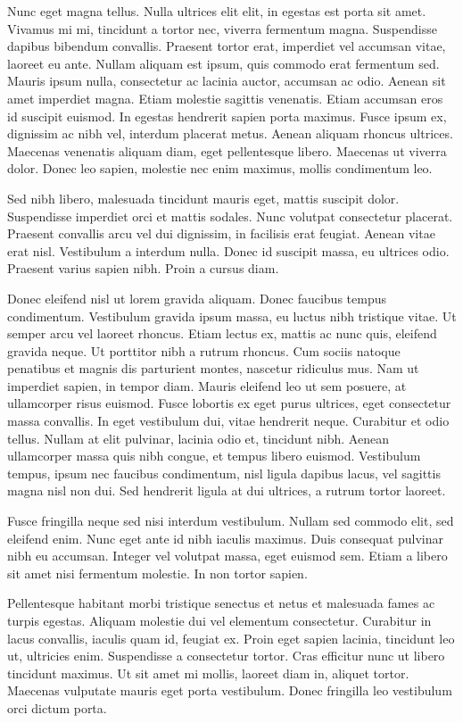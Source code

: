 \documentclass[12pt, letterpaper,twocolumn]{article}
\begin{document}
Nunc eget magna tellus. Nulla ultrices elit elit, in egestas est porta sit amet. Vivamus mi mi, tincidunt a tortor nec, viverra fermentum magna. Suspendisse dapibus bibendum convallis. Praesent tortor erat, imperdiet vel accumsan vitae, laoreet eu ante. Nullam aliquam est ipsum, quis commodo erat fermentum sed. Mauris ipsum nulla, consectetur ac lacinia auctor, accumsan ac odio. Aenean sit amet imperdiet magna. Etiam molestie sagittis venenatis. Etiam accumsan eros id suscipit euismod. In egestas hendrerit sapien porta maximus. Fusce ipsum ex, dignissim ac nibh vel, interdum placerat metus. Aenean aliquam rhoncus ultrices. Maecenas venenatis aliquam diam, eget pellentesque libero. Maecenas ut viverra dolor. Donec leo sapien, molestie nec enim maximus, mollis condimentum leo.

Sed nibh libero, malesuada tincidunt mauris eget, mattis suscipit dolor. Suspendisse imperdiet orci et mattis sodales. Nunc volutpat consectetur placerat. Praesent convallis arcu vel dui dignissim, in facilisis erat feugiat. Aenean vitae erat nisl. Vestibulum a interdum nulla. Donec id suscipit massa, eu ultrices odio. Praesent varius sapien nibh. Proin a cursus diam.

Donec eleifend nisl ut lorem gravida aliquam. Donec faucibus tempus condimentum. Vestibulum gravida ipsum massa, eu luctus nibh tristique vitae. Ut semper arcu vel laoreet rhoncus. Etiam lectus ex, mattis ac nunc quis, eleifend gravida neque. Ut porttitor nibh a rutrum rhoncus. Cum sociis natoque penatibus et magnis dis parturient montes, nascetur ridiculus mus. Nam ut imperdiet sapien, in tempor diam. Mauris eleifend leo ut sem posuere, at ullamcorper risus euismod. Fusce lobortis ex eget purus ultrices, eget consectetur massa convallis. In eget vestibulum dui, vitae hendrerit neque. Curabitur et odio tellus. Nullam at elit pulvinar, lacinia odio et, tincidunt nibh. Aenean ullamcorper massa quis nibh congue, et tempus libero euismod. Vestibulum tempus, ipsum nec faucibus condimentum, nisl ligula dapibus lacus, vel sagittis magna nisl non dui. Sed hendrerit ligula at dui ultrices, a rutrum tortor laoreet.

Fusce fringilla neque sed nisi interdum vestibulum. Nullam sed commodo elit, sed eleifend enim. Nunc eget ante id nibh iaculis maximus. Duis consequat pulvinar nibh eu accumsan. Integer vel volutpat massa, eget euismod sem. Etiam a libero sit amet nisi fermentum molestie. In non tortor sapien.

Pellentesque habitant morbi tristique senectus et netus et malesuada fames ac turpis egestas. Aliquam molestie dui vel elementum consectetur. Curabitur in lacus convallis, iaculis quam id, feugiat ex. Proin eget sapien lacinia, tincidunt leo ut, ultricies enim. Suspendisse a consectetur tortor. Cras efficitur nunc ut libero tincidunt maximus. Ut sit amet mi mollis, laoreet diam in, aliquet tortor. Maecenas vulputate mauris eget porta vestibulum. Donec fringilla leo vestibulum orci dictum porta.
\end{document}
